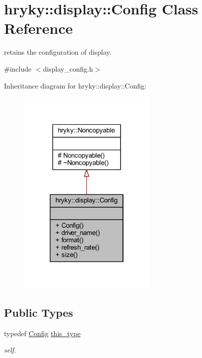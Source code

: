 \hypertarget{classhryky_1_1display_1_1_config}{\section{hryky\-:\-:display\-:\-:Config Class Reference}
\label{classhryky_1_1display_1_1_config}
}


retains the configuration of display.  




{\ttfamily \#include $<$display\-\_\-config.\-h$>$}



Inheritance diagram for hryky\-:\-:display\-:\-:Config\-:
\nopagebreak
\begin{figure}[H]
\begin{center}
\leavevmode
\includegraphics[width=190pt]{classhryky_1_1display_1_1_config__inherit__graph}
\end{center}
\end{figure}
\subsection*{Public Types}
\begin{DoxyCompactItemize}
\item 
\hypertarget{classhryky_1_1display_1_1_config_a9aec5d4d622e17f4da8bf74403cbff4a}{typedef \hyperlink{classhryky_1_1display_1_1_config}{Config} \hyperlink{classhryky_1_1display_1_1_config_a9aec5d4d622e17f4da8bf74403cbff4a}{this\-\_\-type}}\label{classhryky_1_1display_1_1_config_a9aec5d4d622e17f4da8bf74403cbff4a}

\begin{DoxyCompactList}\small\item\em self. \end{DoxyCompactList}\end{DoxyCompactItemize}
